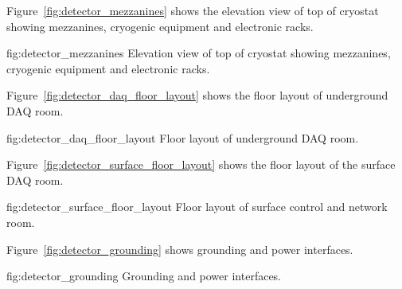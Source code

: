 Figure~\ref{fig:detector_mezzanines} shows the elevation view of top
of cryostat showing mezzanines, cryogenic equipment and electronic
racks.
\begin{dunefigure}{fig:detector_mezzanines}
  {Elevation view of top of cryostat showing mezzanines, cryogenic
    equipment and electronic racks.}
\end{dunefigure}

Figure~\ref{fig:detector_daq_floor_layout} shows the floor layout of underground DAQ room.
\begin{dunefigure}{fig:detector_daq_floor_layout}
  {Floor layout of underground DAQ room.}
\end{dunefigure}

Figure~\ref{fig:detector_surface_floor_layout} shows the floor layout
of the surface DAQ room.
\begin{dunefigure}{fig:detector_surface_floor_layout} {Floor layout of surface control and network room.}
\end{dunefigure}
Figure~\ref{fig:detector_grounding} shows grounding and power interfaces.
\begin{dunefigure}{fig:detector_grounding} {Grounding and power interfaces.}
\end{dunefigure}





